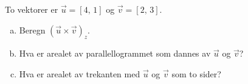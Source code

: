 %
To vektorer er $\vec{u} = [4,\,1]$ og $\vec{v} = [2,\,3]$.
\begin{enumerate}[a)]
    \item Beregn $(\vec{u}\times\vec{v})_z$.
    \item Hva er arealet av parallellogrammet som dannes av $\vec{u}$ og $\vec{v}$?
    \item Hva er arealet av trekanten med $\vec{u}$ og $\vec{v}$ som to sider?
\end{enumerate}
